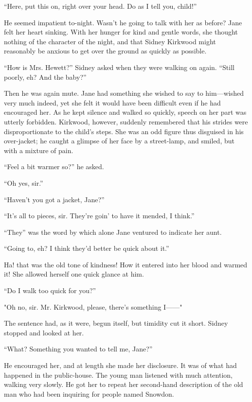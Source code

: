 ``Here, put this on, right over your head. Do as I tell you, child!''

He seemed impatient to-night. Wasn't he going to talk with her as
before? Jane felt her heart sinking. With her hunger for kind and gentle
words, she thought nothing of the character of the night, and that
Sidney Kirkwood might reasonably be anxious to get over the ground as
quickly as possible.

{\protect\hypertarget{31}{}{}}``How is Mrs. Hewett?'' Sidney asked when
they were walking on again. ``Still poorly, eh? And the baby?''

Then he was again mute. Jane had something she wished to say to
him---wished very much indeed, yet she felt it would have been difficult
even if he had encouraged her. As he kept silence and walked so quickly,
speech on her part was utterly forbidden. Kirkwood, however, suddenly
remembered that his strides were disproportionate to the child's steps.
She was an odd figure thus disguised in his over-jacket; he caught a
glimpse of her face by a street-lamp, and smiled, but with a mixture of
pain.

``Feel a bit warmer so?'' he asked.

``Oh yes, sir.''

``Haven't you got a jacket, Jane?''

``It's all to pieces, sir. They're goin' to have it mended, I think.''

``They'' was the word by which alone Jane ventured to indicate her aunt.

``Going to, eh? I think they'd better be quick about it.''

{\protect\hypertarget{32}{}{}}Ha! that was the old tone of kindness! How
it entered into her blood and warmed it! She allowed herself one quick
glance at him.

``Do I walk too quick for you?''

"Oh no, sir. Mr. Kirkwood, please, there's something I{{------}}"

The sentence had, as it were, begun itself, but timidity cut it short.
Sidney stopped and looked at her.

``What? Something you wanted to tell me, Jane?''

He encouraged her, and at length she made her disclosure. It was of what
had happened in the public-house. The young man listened with much
attention, walking very slowly. He got her to repeat her second-hand
description of the old man who had been inquiring for people named
Snowdon.

